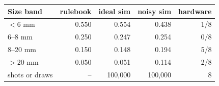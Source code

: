 \begin{tabular}{lrrrr}
\toprule
Size band & rulebook & ideal sim & noisy sim & hardware\\
\midrule
$<6$ mm & 0.550 & 0.554 & 0.438 & 1/8\\
6--8 mm & 0.250 & 0.247 & 0.254 & 0/8\\
8--20 mm & 0.150 & 0.148 & 0.194 & 5/8\\
$>20$ mm & 0.050 & 0.051 & 0.114 & 2/8\\
\midrule
shots or draws & -- & 100{,}000 & 100{,}000 & 8\\
\bottomrule
\end{tabular}
